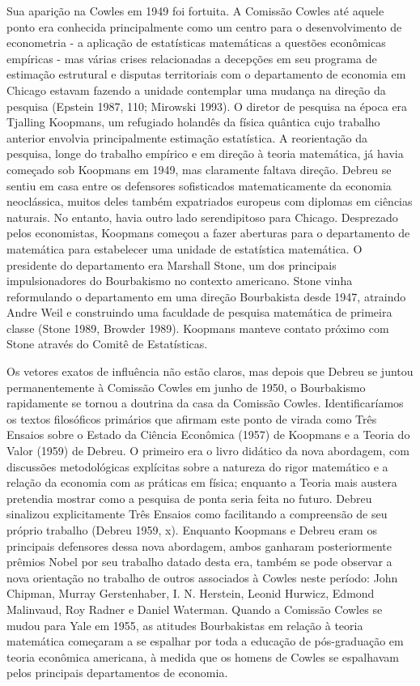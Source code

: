 \documentclass[12pt]{article}
\begin{document}
Sua aparição na Cowles em 1949 foi fortuita. A Comissão Cowles até aquele ponto era conhecida principalmente como um centro para o desenvolvimento de econometria - a aplicação de estatísticas matemáticas a questões econômicas empíricas - mas várias crises relacionadas a decepções em seu programa de estimação estrutural e disputas territoriais com o departamento de economia em Chicago estavam fazendo a unidade contemplar uma mudança na direção da pesquisa (Epstein 1987, 110; Mirowski 1993). O diretor de pesquisa na época era Tjalling Koopmans, um refugiado holandês da física quântica cujo trabalho anterior envolvia principalmente estimação estatística. A reorientação da pesquisa, longe do trabalho empírico e em direção à teoria matemática, já havia começado sob Koopmans em 1949, mas claramente faltava direção. Debreu se sentiu em casa entre os defensores sofisticados matematicamente da economia neoclássica, muitos deles também expatriados europeus com diplomas em ciências naturais. No entanto, havia outro lado serendipitoso para Chicago. Desprezado pelos economistas, Koopmans começou a fazer aberturas para o departamento de matemática para estabelecer uma unidade de estatística matemática. O presidente do departamento era Marshall Stone, um dos principais impulsionadores do Bourbakismo no contexto americano. Stone vinha reformulando o departamento em uma direção Bourbakista desde 1947, atraindo Andre Weil e construindo uma faculdade de pesquisa matemática de primeira classe (Stone 1989, Browder 1989). Koopmans manteve contato próximo com Stone através do Comitê de Estatísticas.

Os vetores exatos de influência não estão claros, mas depois que Debreu se juntou permanentemente à Comissão Cowles em junho de 1950, o Bourbakismo rapidamente se tornou a doutrina da casa da Comissão Cowles. Identificaríamos os textos filosóficos primários que afirmam este ponto de virada como Três Ensaios sobre o Estado da Ciência Econômica (1957) de Koopmans e a Teoria do Valor (1959) de Debreu. O primeiro era o livro didático da nova abordagem, com discussões metodológicas explícitas sobre a natureza do rigor matemático e a relação da economia com as práticas em física; enquanto a Teoria mais austera pretendia mostrar como a pesquisa de ponta seria feita no futuro. Debreu sinalizou explicitamente Três Ensaios como facilitando a compreensão de seu próprio trabalho (Debreu 1959, x). Enquanto Koopmans e Debreu eram os principais defensores dessa nova abordagem, ambos ganharam posteriormente prêmios Nobel por seu trabalho datado desta era, também se pode observar a nova orientação no trabalho de outros associados à Cowles neste período: John Chipman, Murray Gerstenhaber, I. N. Herstein, Leonid Hurwicz, Edmond Malinvaud, Roy Radner e Daniel Waterman. Quando a Comissão Cowles se mudou para Yale em 1955, as atitudes Bourbakistas em relação à teoria matemática começaram a se espalhar por toda a educação de pós-graduação em teoria econômica americana, à medida que os homens de Cowles se espalhavam pelos principais departamentos de economia.
\end{document}
